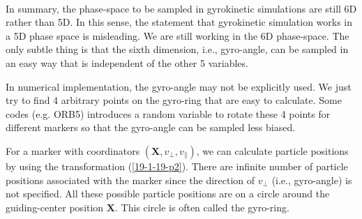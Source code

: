 \documentclass{llncs}
\begin{document}
\

In summary, the phase-space to be sampled in gyrokinetic simulations are
still 6D rather than 5D. In this sense, the statement that gyrokinetic
simulation works in a 5D phase space is misleading. We are still working in
the 6D phase-space. The only subtle thing is that the sixth dimension, i.e.,
gyro-angle, can be sampled in an easy way that is independent of the other 5
variables.

In numerical implementation, the gyro-angle may not be explicitly used. We
just try to find 4 arbitrary points on the gyro-ring that are easy to
calculate. Some codes (e.g. ORB5) introduces a random variable to rotate these
4 points for different markers so that the gyro-angle can be sampled less
biased.

For a marker with coordinators $(\mathbf{X}, v_{\perp}, v_{\parallel})$, we
can calculate particle positions by using the transformation
(\ref{19-1-19-p2}). There are infinite number of particle positions associated
with the marker since the direction of $v_{\perp}$ (i.e., gyro-angle) is not
specified. All these possible particle positions are on a circle around the
guiding-center position $\mathbf{X}$. This circle is often called the
gyro-ring.

\

\
\end{document}
